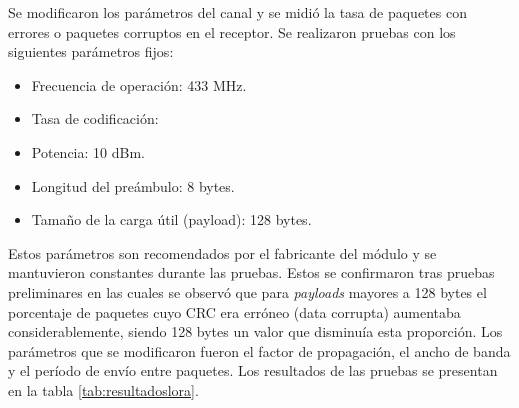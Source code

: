 Se modificaron los parámetros del canal y se midió la tasa de paquetes con errores o paquetes corruptos en el receptor. Se realizaron pruebas con los siguientes parámetros fijos:

\begin{itemize}
    \item Frecuencia de operación: 433 MHz.
    \item Tasa de codificación:
    \item Potencia: 10 dBm.
    \item Longitud del preámbulo: 8 bytes.
    \item Tamaño de la carga útil (payload): 128 bytes.
\end{itemize}

Estos parámetros son recomendados por el fabricante del módulo y se mantuvieron constantes durante las pruebas. Estos se confirmaron tras pruebas preliminares en las cuales se observó que para \textit{payloads} mayores a 128 bytes el porcentaje de paquetes cuyo CRC era erróneo (data corrupta) aumentaba considerablemente, siendo 128 bytes un valor que disminuía esta proporción. Los parámetros que se modificaron fueron el factor de propagación, el ancho de banda y el período de envío entre paquetes. Los resultados de las pruebas se presentan en la tabla \ref{tab:resultadoslora}.

\begin{table}[H]
    \centering
    \caption{Resultados de pruebas realizadas con módulo de comunicaciones Ra-02.}
    \label{tab:resultadoslora}
    \end{table}

